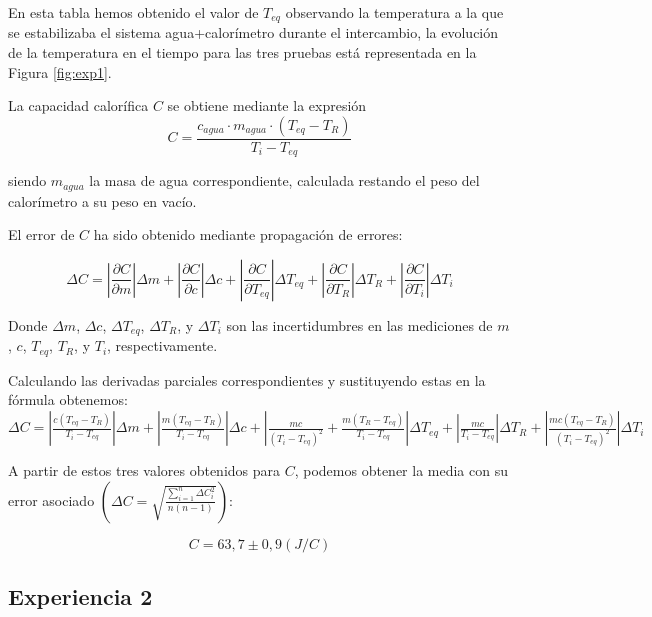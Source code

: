 \documentclass[a4paper,12pt,spanish]{article}
\begin{document}
	
	En esta tabla hemos obtenido el valor de $T_{eq}$ observando la temperatura a la que se estabilizaba el sistema agua+calorímetro durante el intercambio, la evolución de la temperatura en el tiempo para las tres pruebas está representada en la Figura \ref{fig:exp1}.
	
	La capacidad calorífica $C$ se obtiene mediante la expresión
	\[ C= \frac{c_{agua}\cdot m_{agua}\cdot(T_{eq}-T_R)}{T_i-T_{eq}}
	\]
	
	siendo $m_{agua}$ la masa de agua correspondiente, calculada restando el peso del calorímetro a su peso en vacío.
	
	El error de $C$ ha sido obtenido mediante propagación de errores:
	
	\[\Delta C = \left|\frac{\partial C}{\partial m}\right|\Delta m + \left|\frac{\partial C}{\partial c}\right|\Delta c + \left|\frac{\partial C}{\partial T_{eq}}\right|\Delta T_{eq} + \left|\frac{\partial C}{\partial T_R}\right|\Delta T_R + \left|\frac{\partial C}{\partial T_i}\right|\Delta T_i\]
	
	Donde $\Delta m$, $\Delta c$, $\Delta T_{eq}$, $\Delta T_R$, y $\Delta T_i$ son las incertidumbres en las mediciones de $m$, $c$, $T_{eq}$, $T_R$, y $T_i$, respectivamente.
	
	Calculando las derivadas parciales correspondientes y sustituyendo estas en la fórmula obtenemos:\\
	
	$\Delta C = \left|\frac{c(T_{eq}-T_R)}{T_i-T_{eq}}\right|\Delta m + \left|\frac{m(T_{eq}-T_R)}{T_i-T_{eq}}\right|\Delta c + \left|\frac{mc}{(T_i-T_{eq})^2} + \frac{m(T_R-T_{eq})}{T_i-T_{eq}}\right|\Delta T_{eq} + \left|\frac{mc}{T_i-T_{eq}}\right|\Delta T_R + \left|\frac{mc(T_{eq}-T_R)}{(T_i-T_{eq})^2}\right|\Delta T_i$
	
	\vspace{12pt}
	\vspace{12pt}
	
	A partir de estos tres valores obtenidos para $C$, podemos obtener la media con su error asociado $\left(\Delta C = \sqrt{\frac{\sum_{i=1}^{n}\Delta C_i^2}{n(n-1)}}  \right)$:
	
	\[\boxed{C = 63,7 \pm 0,9  (\si{J/C}) }\]
	
	\subsection{Experiencia 2}
	
\end{document}
